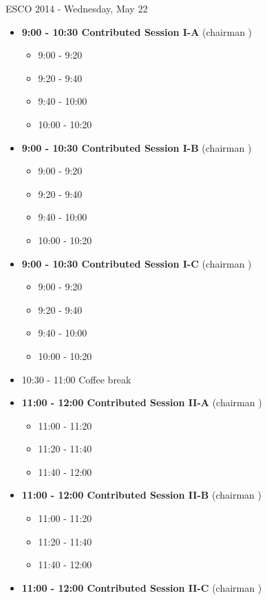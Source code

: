 \documentclass[10pt, A4]{article}
\begin{document}
\centerline{\huge ESCO 2014 - Wednesday, May 22}
\vspace{4mm}

\begin{itemize}    
  \item {\bf 9:00 - 10:30 Contributed Session I-A} (chairman ) 
  \begin{itemize}
    \item 9:00 - 9:20 
    \item 9:20 - 9:40 
    \item 9:40 - 10:00 
    \item 10:00 - 10:20  
  \end{itemize}
  \item {\bf 9:00 - 10:30 Contributed Session I-B} (chairman ) 
  \begin{itemize}
    \item 9:00 - 9:20 
    \item 9:20 - 9:40 
    \item 9:40 - 10:00 
    \item 10:00 - 10:20      
  \end{itemize}
    \item {\bf 9:00 - 10:30 Contributed Session I-C} (chairman ) 
  \begin{itemize}
    \item 9:00 - 9:20 
    \item 9:20 - 9:40 
    \item 9:40 - 10:00 
    \item 10:00 - 10:20      
  \end{itemize}
  \item 10:30 - 11:00 Coffee break
  \item {\bf 11:00 - 12:00 Contributed Session II-A} (chairman ) 
  \begin{itemize}
    \item 11:00 - 11:20 
    \item 11:20 - 11:40 
    \item 11:40 - 12:00 
  \end{itemize}
  \item {\bf 11:00 - 12:00 Contributed Session II-B} (chairman ) 
  \begin{itemize}
    \item 11:00 - 11:20 
    \item 11:20 - 11:40 
    \item 11:40 - 12:00  
  \end{itemize}
  \item {\bf 11:00 - 12:00 Contributed Session II-C} (chairman ) 

\end{itemize}
\end{document}
